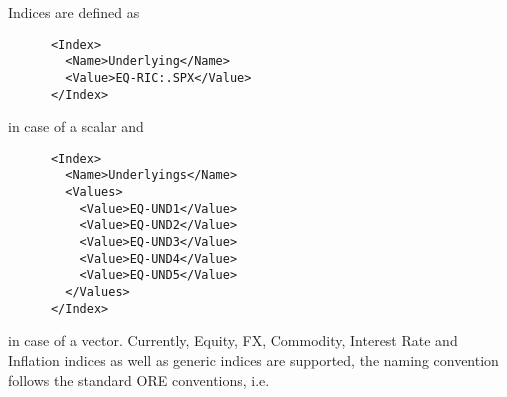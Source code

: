 Indices are defined as

\begin{verbatim}
      <Index>
        <Name>Underlying</Name>
        <Value>EQ-RIC:.SPX</Value>
      </Index>
\end{verbatim}

in case of a scalar and

\begin{verbatim}
      <Index>
        <Name>Underlyings</Name>
        <Values>
          <Value>EQ-UND1</Value>
          <Value>EQ-UND2</Value>
          <Value>EQ-UND3</Value>
          <Value>EQ-UND4</Value>
          <Value>EQ-UND5</Value>
        </Values>
      </Index>
\end{verbatim}

in case of a vector. Currently, Equity, FX, Commodity, Interest Rate and Inflation indices as well as generic indices are
supported, the naming convention follows the standard ORE conventions, i.e.

